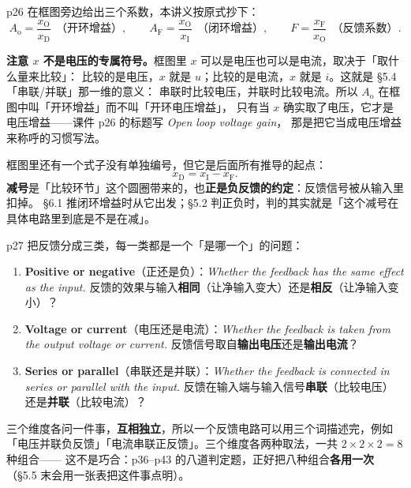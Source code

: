\documentclass[11pt]{ctexart}
\begin{document}
p26 在框图旁边给出三个系数，本讲义按原式抄下：
\[
A_{\mathrm{o}}=\frac{x_{\mathrm{O}}}{x_{\mathrm{D}}}\ \ \text{（开环增益）},\qquad
A_{\mathrm{F}}=\frac{x_{\mathrm{O}}}{x_{\mathrm{I}}}\ \ \text{（闭环增益）},\qquad
F=\frac{x_{\mathrm{F}}}{x_{\mathrm{O}}}\ \ \text{（反馈系数）}.
\]

\begin{wbx}
\textbf{注意 $x$ 不是电压的专属符号。}框图里 $x$ 可以是电压也可以是电流，取决于「取什么量来比较」：
比较的是电压，$x$ 就是 $u$；比较的是电流，$x$ 就是 $i$。这就是 §5.4「串联/并联」那一维的意义：
串联时比较电压，并联时比较电流。所以 $A_{\mathrm{o}}$ 在框图中叫「开环增益」而不叫「开环电压增益」，
只有当 $x$ 确实取了电压，它才是电压增益——课件 p26 的标题写 \textit{Open loop voltage gain}，
那是把它当成电压增益来称呼的习惯写法。
\end{wbx}

框图里还有一个式子没有单独编号，但它是后面所有推导的起点：
\[
x_{\mathrm{D}}=x_{\mathrm{I}}-x_{\mathrm{F}} .
\]
\textbf{减号}是「比较环节」这个圆圈带来的，也\textbf{正是负反馈的约定}：反馈信号被从输入里扣掉。
§6.1 推闭环增益时从它出发；§5.2 判正负时，判的其实就是「这个减号在具体电路里到底是不是在减」。



p27 把反馈分成三类，每一类都是一个「是哪一个」的问题：

\begin{enumerate}
\item \textbf{Positive or negative}（正还是负）：\textit{Whether the feedback has the same effect as the input.}
反馈的效果与输入\textbf{相同}（让净输入变大）还是\textbf{相反}（让净输入变小）？
\item \textbf{Voltage or current}（电压还是电流）：\textit{Whether the feedback is taken from the output
voltage or current.} 反馈信号取自\textbf{输出电压}还是\textbf{输出电流}？
\item \textbf{Series or parallel}（串联还是并联）：\textit{Whether the feedback is connected in series
or parallel with the input.} 反馈在输入端与输入信号\textbf{串联}（比较电压）还是\textbf{并联}（比较电流）？
\end{enumerate}

三个维度各问一件事，\textbf{互相独立}，所以一个反馈电路可以用三个词描述完，例如
「电压并联负反馈」「电流串联正反馈」。三个维度各两种取法，一共 $2\times2\times2=8$ 种组合——
这不是巧合：p36--p43 的八道判定题，正好把八种组合\textbf{各用一次}（§5.5 末会用一张表把这件事点明）。
\end{document}
